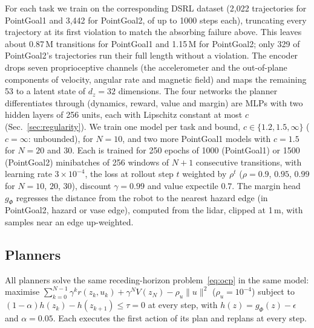 For each task we train on the corresponding DSRL dataset (2,022 trajectories for PointGoal1 and 3,442 for PointGoal2,
of up to 1000 steps each), truncating every trajectory at its first violation to match the absorbing failure above.
This leaves about 0.87\,M transitions for PointGoal1 and 1.15\,M for PointGoal2; only 329 of PointGoal2's trajectories
run their full length without a violation.
The encoder drops seven proprioceptive channels (the accelerometer and the out-of-plane components of velocity,
angular rate and magnetic field) and maps the remaining 53 to a latent state of $d_z=32$ dimensions. The four networks
the planner differentiates through (dynamics, reward, value and margin) are MLPs with two hidden layers of 256 units,
each with Lipschitz constant at most $c$ (Sec.~\ref{sec:regularity}). We train one model per task and bound,
$c\in\{1.2,1.5,\infty\}$ ($c=\infty$: unbounded), for $N=10$, and two more PointGoal1 models with $c=1.5$ for $N=20$
and $30$. Each is trained for 250 epochs of 1000 (PointGoal1) or 1500 (PointGoal2) minibatches of 256 windows of $N+1$
consecutive transitions, with learning rate $3\times10^{-4}$, the loss at rollout step $t$ weighted by $\rho^t$
($\rho=0.9$, $0.95$, $0.99$ for $N=10$, $20$, $30$), discount $\gamma=0.99$ and value expectile $0.7$. The margin head
$g_\Phi$ regresses the distance from the robot to the nearest hazard edge (in PointGoal2, hazard or vase edge),
computed from the lidar, clipped at 1\,m, with samples near an edge up-weighted.

\subsection{Planners}\label{sec:planners}

All planners solve the same receding-horizon problem~\eqref{eq:ocp} in the same model: maximise
$\sum_{k=0}^{N-1}\gamma^k r(z_k,u_k)+\gamma^N V(z_N)-\rho_u\|u\|^2$ ($\rho_u=10^{-4}$) subject to
$(1-\alpha)h(z_k)-h(z_{k+1})\le\tau=0$ at every step, with $h(z)=g_\Phi(z)-\epsilon$ and $\alpha=0.05$. Each executes
the first action of its plan and replans at every step.

